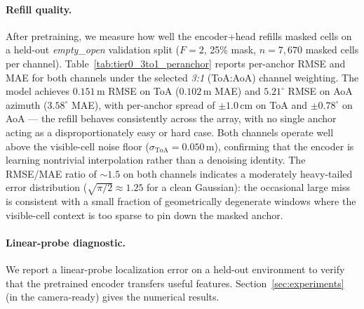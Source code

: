 \paragraph{Refill quality.}
After pretraining, we measure how well the encoder+head refills
masked cells on a held-out \emph{empty\_open} validation split
($F{=}2$, 25\% mask, $n{=}7{,}670$ masked cells per channel).
Table~\ref{tab:tier0_3to1_peranchor} reports per-anchor RMSE and
MAE for both channels under the selected \emph{3:1} (ToA:AoA)
channel weighting. The model achieves $0.151$\,m RMSE on ToA
($0.102$\,m MAE) and $5.21^\circ$ RMSE on AoA azimuth
($3.58^\circ$ MAE), with per-anchor spread of $\pm 1.0$\,cm on
ToA and $\pm 0.78^\circ$ on AoA — the refill behaves consistently
across the array, with no single anchor acting as a
disproportionately easy or hard case. Both channels operate
well above the visible-cell noise floor
($\sigma_{\text{ToA}}{=}0.050$\,m), confirming that the encoder
is learning nontrivial interpolation rather than a denoising
identity. The RMSE/MAE ratio of $\sim 1.5$ on both channels
indicates a moderately heavy-tailed error distribution
($\sqrt{\pi/2}{\approx}1.25$ for a clean Gaussian): the
occasional large miss is consistent with a small fraction of
geometrically degenerate windows where the visible-cell context
is too sparse to pin down the masked anchor.



\paragraph{Linear-probe diagnostic.}
We report a linear-probe localization error on a held-out
environment to verify that the pretrained encoder transfers
useful features. Section~\ref{sec:experiments} (in the
camera-ready) gives the numerical results.
